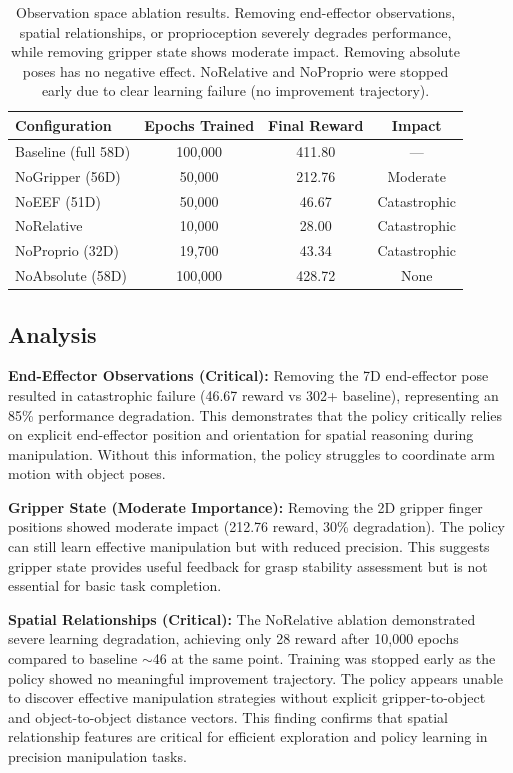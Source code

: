 \documentclass[12pt,a4paper,oneside]{report}
\begin{document}
\begin{table}[h]
\centering
\begin{tabular}{|l|c|c|c|}
\hline
\textbf{Configuration} & \textbf{Epochs Trained} & \textbf{Final Reward} & \textbf{Impact} \\
\hline
Baseline (full 58D) & 100,000 & 411.80 & --- \\
NoGripper (56D) & 50,000 & 212.76 & Moderate \\
NoEEF (51D) & 50,000 & 46.67 & Catastrophic \\
NoRelative & 10,000 & 28.00 & Catastrophic \\
NoProprio (32D) & 19,700 & 43.34 & Catastrophic \\
NoAbsolute (58D) & 100,000 & 428.72 & None \\
\hline
\end{tabular}
\caption{Observation space ablation results. Removing end-effector observations, spatial relationships, or proprioception severely degrades performance, while removing gripper state shows moderate impact. Removing absolute poses has no negative effect. NoRelative and NoProprio were stopped early due to clear learning failure (no improvement trajectory).}
\label{tab:observation_ablation}
\end{table}

\subsection{Analysis}

\textbf{End-Effector Observations (Critical):}
Removing the 7D end-effector pose resulted in catastrophic failure (46.67 reward vs 302+ baseline), representing an 85\% performance degradation. This demonstrates that the policy critically relies on explicit end-effector position and orientation for spatial reasoning during manipulation. Without this information, the policy struggles to coordinate arm motion with object poses.

\textbf{Gripper State (Moderate Importance):}
Removing the 2D gripper finger positions showed moderate impact (212.76 reward, 30\% degradation). The policy can still learn effective manipulation but with reduced precision. This suggests gripper state provides useful feedback for grasp stability assessment but is not essential for basic task completion.

\textbf{Spatial Relationships (Critical):}
The NoRelative ablation demonstrated severe learning degradation, achieving only 28 reward after 10,000 epochs compared to baseline $\sim$46 at the same point. Training was stopped early as the policy showed no meaningful improvement trajectory. The policy appears unable to discover effective manipulation strategies without explicit gripper-to-object and object-to-object distance vectors. This finding confirms that spatial relationship features are critical for efficient exploration and policy learning in precision manipulation tasks.
\end{document}
